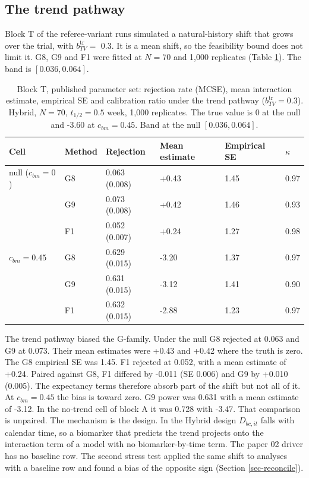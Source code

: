 \documentclass[
  11pt,
]{article}
\begin{document}
\subsection{The trend pathway}\label{sec-trend}

Block T of the referee-variant runs simulated a natural-history shift
that grows over the trial, with \(b_{TV}^{\mathrm{tr}} =\)
0.3. It is a mean shift, so the feasibility bound does
not limit it. G8, G9 and F1 were fitted at \(N = 70\) and
1,000 replicates (Table \ref{tab:tab-trend}). The band is
\([0.036, 0.064]\).

\begin{table}
\centering
\caption{\label{tab:tab-trend}Block T, published parameter set: rejection
      rate (MCSE), mean interaction estimate, empirical SE and
      calibration ratio under the trend pathway
      ($b_{TV}^{\mathrm{tr}} = 0.3$). Hybrid, $N = 70$, $t_{1/2} =
      0.5$ week, 1,000 replicates. The true value is 0 at the null and
      -3.60 at $c_{bm} = 0.45$. Band at the null $[0.036, 0.064]$.}
\centering
\fontsize{9}{11}\selectfont
\begin{tabular}[t]{llllll}
\toprule
Cell & Method & Rejection & Mean estimate & Empirical SE & $\kappa$\\
\midrule
null ($c_{bm} = 0$) & G8 & 0.063 (0.008) & +0.43 & 1.45 & 0.97\\
 & G9 & 0.073 (0.008) & +0.42 & 1.46 & 0.93\\
 & F1 & 0.052 (0.007) & +0.24 & 1.27 & 0.98\\
$c_{bm} = 0.45$ & G8 & 0.629 (0.015) & -3.20 & 1.37 & 0.97\\
 & G9 & 0.631 (0.015) & -3.12 & 1.41 & 0.90\\
 & F1 & 0.632 (0.015) & -2.88 & 1.23 & 0.97\\
\bottomrule
\end{tabular}
\end{table}

The trend pathway biased the G-family. Under the null G8 rejected at
0.063 and G9 at 0.073. Their mean estimates were
+0.43 and +0.42 where the truth is zero. The
G8 empirical SE was 1.45. F1 rejected at 0.052,
with a mean estimate of +0.24. Paired against G8, F1
differed by -0.011 (SE 0.006) and G9 by
+0.010 (0.005). The expectancy terms therefore
absorb part of the shift but not all of it. At \(c_{bm} = 0.45\) the
bias is toward zero. G9 power was 0.631 with a mean
estimate of -3.12. In the no-trend cell of block A it
was 0.728 with -3.47. That comparison is
unpaired. The mechanism is the design. In the Hybrid design
\(D_{bc,it}\) falls with calendar time, so a biomarker that predicts
the trend projects onto the interaction term of a model with no
biomarker-by-time term. The paper 02 driver has no baseline row. The
second stress test applied the same shift to analyses with a
baseline row and found a bias of the opposite sign (Section
\ref{sec-reconcile}).
\end{document}
